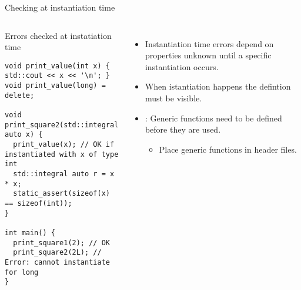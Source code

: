 \begin{frame}[t,fragile]{Checking at instantiation time}

\begin{columns}[T]


\begin{block}{Errors checked at instatiation time}
\begin{lstlisting}
void print_value(int x) { std::cout << x << '\n'; }
void print_value(long) = delete;

void print_square2(std::integral auto x) {
  print_value(x); // OK if instantiated with x of type int
  std::integral auto r = x * x;
  static_assert(sizeof(x) == sizeof(int));
}

int main() {
  print_square1(2); // OK
  print_square2(2L); // Error: cannot instantiate for long
}
\end{lstlisting}
\end{block}


\pause
\begin{itemize}
  \item Instantiation time errors depend on properties unknown until a specific instantiation occurs.

  \item When istantiation happens the defintion must be visible.

  \item {}: Generic functions need to be defined before they are used.
    \begin{itemize}
      \item Place generic functions in header files.
    \end{itemize}
\end{itemize}

\end{columns}

\end{frame}
